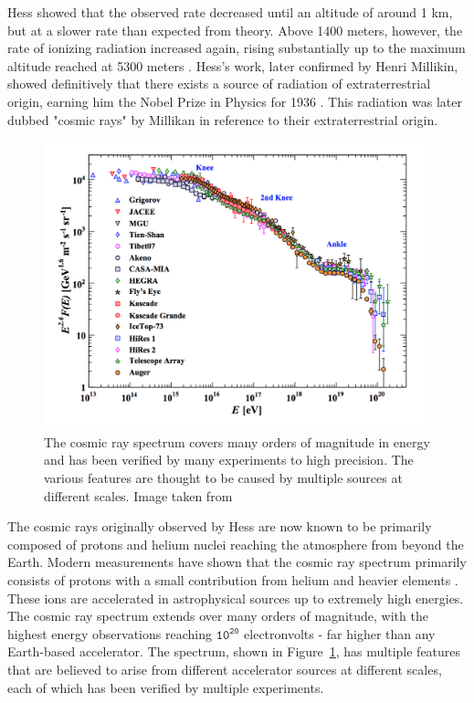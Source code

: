 Hess showed that the observed rate decreased until an altitude of around 1 km, but at a slower rate than expected from theory.
Above 1400 meters, however, the rate of ionizing radiation increased again, rising substantially up to the maximum altitude reached at 5300 meters \cite{Compton-CRAltitude}.
Hess's work, later confirmed by Henri Millikin, showed definitively that there exists a source of radiation of extraterrestrial origin, earning him the Nobel Prize in Physics for 1936 \cite{NobelPrize:1936-Hess}.
This radiation was later dubbed "cosmic rays" by Millikan in reference to their extraterrestrial origin.

\begin{figure}[!h]
\centering
\includegraphics[width=0.9\linewidth]{CR_Spectrum_PDG15.png}
\caption[The cosmic ray spectrum as a function of energy]{The cosmic ray spectrum covers many orders of magnitude in energy and has been verified by many experiments to high precision. The various features are thought to be caused by multiple sources at different scales. Image taken from \cite{PDG-2015}}
\label{fig:CR_spectrum}
\end{figure}

The cosmic rays originally observed by Hess are now known to be primarily composed of protons and helium nuclei reaching the atmosphere from beyond the Earth.
Modern measurements have shown that the cosmic ray spectrum primarily consists of protons with a small contribution from helium and heavier elements \cite{PDG-2015}.
These ions are accelerated in astrophysical sources up to extremely high energies.
The cosmic ray spectrum extends over many orders of magnitude, with the highest energy observations reaching $\mathtt{10^{20}}$ electronvolts - far higher than any Earth-based accelerator.
The spectrum, shown in Figure~\ref{fig:CR_spectrum}, has multiple features that are believed to arise from different accelerator sources at different scales, each of which has been verified by multiple experiments.

